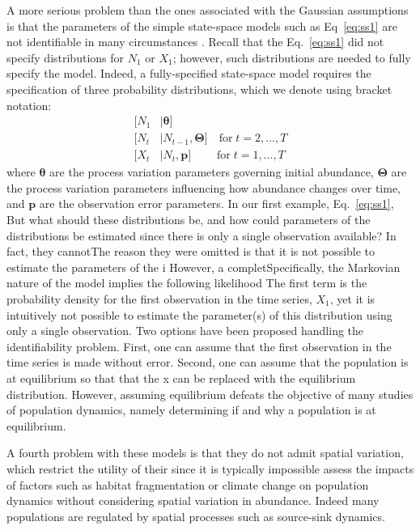 \documentclass[12pt]{article}
\begin{document}
A more serious problem than the ones associated with the Gaussian
assumptions is that the parameters of the simple state-space models
such as Eq~\ref{eq:ss1} are not identifiable in many
circumstances \citep{polansky_etal:2009}. Recall that the
Eq.~\ref{eq:ss1} did not specify distributions for $N_1$ or
$X_1$; however, such distributions are needed to fully specify the
model. Indeed, a fully-specified state-space model requires the
specification of three probability distributions, which we denote
using bracket notation:
\begin{subequations}
  \label{eq:ss2}
  \begin{align}
    [N_1&|\bm{\theta}] \\ \label{eq:ss2b}
    [N_t&|N_{t-1},\bm{\Theta}] \quad \text{for} \; t=2,\hdots,T \\ \label{eq:ss2c}
    [X_t&|N_t,\bm{p}]  \qquad \; \text{for} \; t=1,\hdots,T
  \end{align}
\end{subequations}
where $\bm{\theta}$ are the process variation parameters governing
initial abundance, $\bm{\Theta}$ are the process variation parameters
influencing how abundance changes over time, and $\bm{p}$ are the
observation error parameters. In our first example, Eq.~\ref{eq:ss1},
But what should these distributions be, and how could
parameters of the distributions be
estimated since there is only a single observation available? In fact,
they cannotThe reason they were omitted is that it is not possible to
estimate the parameters of the i
However, a completSpecifically, the Markovian
nature of the model implies the following likelihood
The first term is the probability density for the first observation in
the time series, $X_1$, yet it is intuitively not possible to estimate the
parameter(s) of this distribution using only a single
observation.
Two options have been proposed handling the identifiability
problem. First, one can assume that the first observation in the time
series is made without error. Second, one can assume that the population is at equilibrium
so that that the x can be replaced with the equilibrium
distribution. However, assuming equilibrium defeats the objective of
many studies of population dynamics, namely determining if and why a
population is at equilibrium.

A fourth problem with these models is that they do not admit
spatial variation, which
restrict the utility of their since it is typically
impossible assess the impacts of factors such as habitat
fragmentation or climate change on population dynamics without
considering spatial variation in abundance. Indeed many populations are
regulated by spatial processes such as source-sink dynamics.
\end{document}
